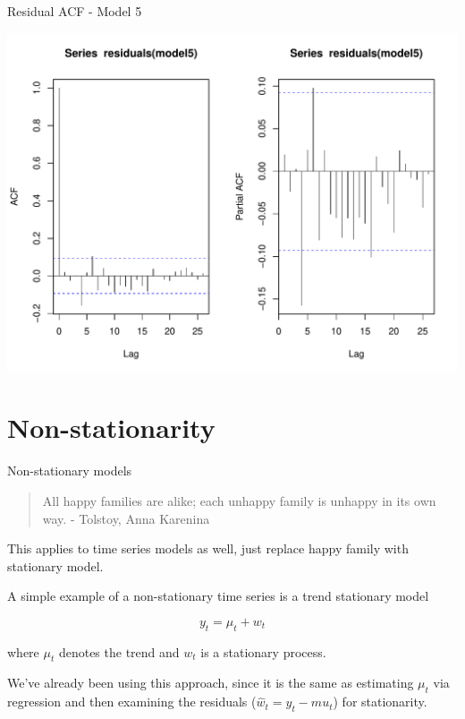 \documentclass[11pt,ignorenonframetext,]{beamer}
\begin{document}
\begin{frame}{Residual ACF - Model 5}

\includegraphics{Lec7_files/figure-beamer/unnamed-chunk-13-1.pdf}

\end{frame}

\section{Non-stationarity}\label{non-stationarity}

\begin{frame}[t]{Non-stationary models}

\vspace{5mm}

\begin{quote}
All happy families are alike; each unhappy family is unhappy in its own
way. - Tolstoy, Anna Karenina
\end{quote}

This applies to time series models as well, just replace happy family
with stationary model.

\pause

\vspace{3mm}

A simple example of a non-stationary time series is a trend stationary
model

\[ y_t = \mu_t + w_t \]

where \(\mu_t\) denotes the trend and \(w_t\) is a stationary process.

\pause

We've already been using this approach, since it is the same as
estimating \(\mu_t\) via regression and then examining the residuals
(\(\hat{w}_t = y_t - \hat{mu}_t\)) for stationarity.

\end{frame}
\end{document}
